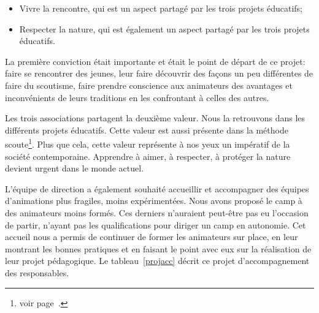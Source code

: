 \documentclass[titlepage,11pt,a4paper]{article}
\begin{document}
\begin{itemize}
   \item Vivre la rencontre, qui est un aspect partagé par les trois projets éducatifs;
   \item Respecter la nature, qui est également un aspect partagé par les trois projets
      éducatifs.
\end{itemize}

La première conviction était importante et était le point de départ de ce projet: faire se
rencontrer des jeunes, leur faire découvrir des façons un peu différentes de faire du
scoutisme, faire prendre conscience aux animateurs des avantages et inconvénients de leurs
traditions en les confrontant à celles des autres.

Les trois associations partagent la deuxième valeur. Nous la retrouvons dans les
différents projets éducatifs. Cette valeur est aussi présente dans la méthode scoute\footnote{voir
page~\pageref{methsc}.}. Plus que cela, cette valeur représente à nos yeux un impératif de la société
contemporaine. Apprendre à aimer, à respecter, à protéger la nature devient urgent dans le
monde actuel.

L'équipe de direction a également souhaité accueillir et accompagner des équipes
d'animations plus fragiles, moins expérimentées. Nous avons proposé le camp à des animateurs moins formés. Ces
derniers n'auraient peut-être pas eu l'occasion de partir, n'ayant pas les qualifications
pour diriger un camp en autonomie. Cet accueil nous a permis de continuer de former les
animateurs sur place, en leur montrant les bonnes pratiques et en faisant le point avec
eux sur la réalisation de leur projet pédagogique.
Le tableau~\ref{projacc} décrit ce projet d'accompagnement des responsables.
\end{document}
